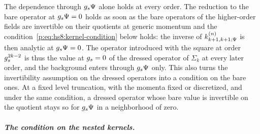 The dependence through $g_s \Psi$ alone holds at every order.
The reduction to the bare operator at $g_s \Psi = 0$ holds as soon as the bare operators of the higher-order fields are invertible on their quotients at generic momentum and the condition~\eqref{p:eq:hs8:kernel-condition} below holds: the inverse of $\kin{k + 1}{\Psi}{n}$ is then analytic at $g_s \Psi = 0$.
The operator introduced with the square at order $g_s^{2 k - 2}$ is thus the value at $g_s = 0$ of the dressed operator of $\Sigma_k$ at every later order, and the background enters through $g_s \Psi$ only.
This also turns the invertibility assumption on the dressed operators into a condition on the bare ones.
At a fixed level truncation, with the momenta fixed or discretized, and under the same condition, a dressed operator whose bare value is invertible on the quotient stays so for $g_s \Psi$ in a neighborhood of zero.

\subparagraph{The condition on the nested kernels.}

